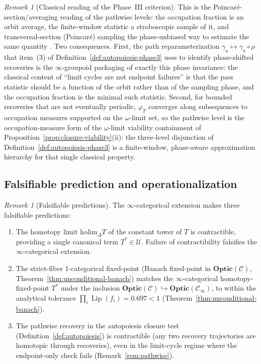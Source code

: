 \documentclass[11pt,a4paper]{article}
\theoremstyle{plain}
\theoremstyle{definition}
\theoremstyle{remark}
\newtheorem{remark}[theorem]{Remark}
\newcommand{\Optic}{\mathbf{Optic}}
\DeclareMathOperator{\Lip}{Lip}
\begin{document}
\begin{remark}[Classical reading of the Phase~III criterion]
\label{rem:poincare-averaging}
This is the Poincar\'e-section/averaging reading of the pathwise
levels: the occupation fraction is an orbit average, the
finite-window statistic a stroboscopic sample of it, and
transversal-section (Poincar\'e) sampling the phase-unbiased way to
estimate the same quantity
\citep{guckenheimer1983,sandersverhulst2007}. Two consequences.
First, the path reparameterization $\gamma_a \mapsto \gamma_a
\circ \rho$ that item~(3) of
Definition~\ref{def:autopoiesis-phase3} uses to identify
phase-shifted recoveries is the $\infty$-groupoid packaging of
exactly this phase invariance: the classical content of ``limit
cycles are not endpoint failures'' is that the pass statistic
should be a function of the orbit rather than of the sampling
phase, and the occupation fraction is the minimal such statistic.
Second, for bounded recoveries that are not eventually periodic,
$\varphi_T$ converges along subsequences to occupation measures
supported on the $\omega$-limit set, so the pathwise level is the
occupation-measure form of the $\omega$-limit viability containment
of Proposition~\ref{prop:closure-viability}(ii): the three-level
disjunction of Definition~\ref{def:autopoiesis-phase3} is a
finite-window, phase-aware approximation hierarchy for that single
classical property.
\end{remark}

\subsection{Falsifiable prediction and operationalization}

\begin{remark}[Falsifiable predictions]
\label{rem:hott-falsifiable}
The $\infty$-categorical extension makes three falsifiable predictions:
\begin{enumerate}[leftmargin=*, itemsep=2pt]
\item The homotopy limit $\mathrm{holim}_\Delta T$ of the constant tower
of $T$ is contractible, providing a single canonical term $T^* \in
\mathcal{U}$. Failure of contractibility falsifies the
$\infty$-categorical extension.
\item The strict-fiber 1-categorical fixed-point (Banach fixed-point in
$\Optic(\mathcal{C})$, Theorem~\ref{thm:unconditional-banach}) matches
the $\infty$-categorical homotopy-fixed-point $T^*$ under the
inclusion $\Optic(\mathcal{C}) \hookrightarrow
\Optic(\mathcal{C}_\infty)$, to within the analytical tolerance
$\prod_i \Lip(f_i) = 0.697 < 1$
(Theorem~\ref{thm:unconditional-banach}).
\item The pathwise recovery in the autopoiesis closure test
(Definition~\ref{def:autopoiesis}) is contractible (any two recovery
trajectories are homotopic through recoveries), even in the limit-cycle
regime where the endpoint-only check fails (Remark~\ref{rem:pathwise}).
\end{enumerate}
\end{remark}
\end{document}

